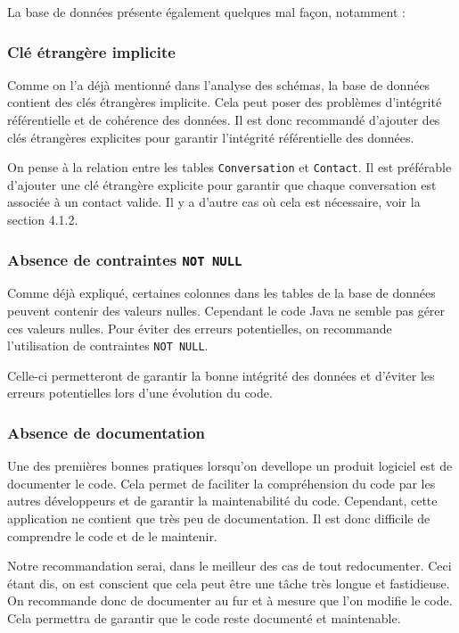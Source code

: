 \documentclass[a4paper,11pt]{article}
\begin{document}
La base de données présente également quelques mal façon, notamment :

\subsubsection*{Clé étrangère implicite}

Comme on l'a déjà mentionné dans l'analyse des schémas, la base de données contient des clés étrangères implicite. Cela peut poser des problèmes d'intégrité référentielle et de cohérence des données. Il est donc recommandé d'ajouter des clés étrangères explicites pour garantir l'intégrité référentielle des données.

On pense à la relation entre les tables \texttt{Conversation} et \texttt{Contact}. Il est préférable d'ajouter une clé étrangère explicite pour garantir que chaque conversation est associée à un contact valide. Il y a d'autre cas où cela est nécessaire, voir la section 4.1.2.

\subsubsection*{Absence de contraintes \texttt{NOT NULL}}

Comme déjà expliqué, certaines colonnes dans les tables de la base de données peuvent contenir des valeurs nulles. Cependant le code Java ne semble pas gérer ces valeurs nulles. Pour éviter des erreurs potentielles, on recommande l'utilisation de contraintes \texttt{NOT NULL}.

Celle-ci permetteront de garantir la bonne intégrité des données et d'éviter les erreurs potentielles lors d'une évolution du code.

\subsubsection*{Absence de documentation}

Une des premières bonnes pratiques lorsqu'on devellope un produit logiciel est de documenter le code. Cela permet de faciliter la compréhension du code par les autres développeurs et de garantir la maintenabilité du code. Cependant, cette application ne contient que très peu de documentation. Il est donc difficile de comprendre le code et de le maintenir.

Notre recommandation serai, dans le meilleur des cas de tout redocumenter. Ceci étant dis, on est conscient que cela peut être une tâche très longue et fastidieuse. On recommande donc de documenter au fur et à mesure que l'on modifie le code. Cela permettra de garantir que le code reste documenté et maintenable.
\end{document}
